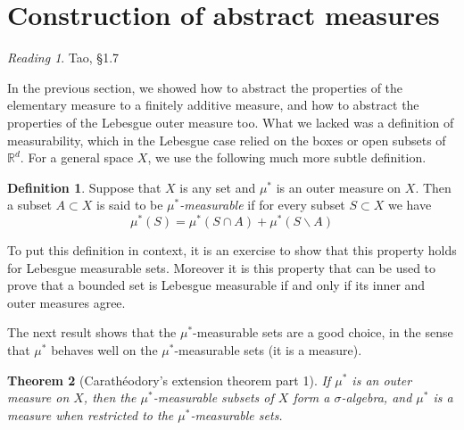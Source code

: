 \documentclass[10pt,oneside]{amsbook}
\renewcommand{\setminus}{\smallsetminus}
\newcommand{\RR}{{\mathbb R}}
\theoremstyle{definition}
\theoremstyle{plain}
\newtheorem{thm}{Theorem}[section]
\theoremstyle{definition}
\newtheorem{defn}[thm]{Definition}
\theoremstyle{remark}
\newtheorem*{reading}{Reading}
\numberwithin{equation}{section}
\numberwithin{figure}{section}
\begin{document}
\newpage
\section{Construction of abstract measures}

\begin{reading}
  Tao, \S 1.7
\end{reading}

In the previous section, we showed how to abstract the properties of the elementary measure to a finitely additive measure, and how to abstract the properties of the Lebesgue outer measure too. What we lacked was a definition of measurability, which in the Lebesgue case relied on the boxes or open subsets of $\RR^d$. For a general space $X$, we use the following much more subtle definition.

\begin{defn}
  Suppose that $X$ is any set and $\mu^*$ is an outer measure on $X$. Then a subset $A\subset X$ is said to be \emph{$\mu^*$-measurable} if for every subset $S\subset X$ we have
  \[\mu^*(S)=\mu^*(S\cap A)+\mu^*(S\setminus A)
  \]
\end{defn}

To put this definition in context, it is an exercise to show that this property holds for Lebesgue measurable sets. Moreover it is this property that can be used to prove that a bounded set is Lebesgue measurable if and only if its inner and outer measures agree.

The next result shows that the $\mu^*$-measurable sets are a good choice, in the sense that $\mu^*$ behaves well on the $\mu^*$-measurable sets (it is a measure).

\begin{thm}[Carath\'eodory's extension theorem part 1]
  If $\mu^*$ is an outer measure on $X$, then the $\mu^*$-measurable subsets of $X$ form a $\sigma$-algebra, and $\mu^*$ is a measure when restricted to the $\mu^*$-measurable sets.
\end{thm}
\end{document}
